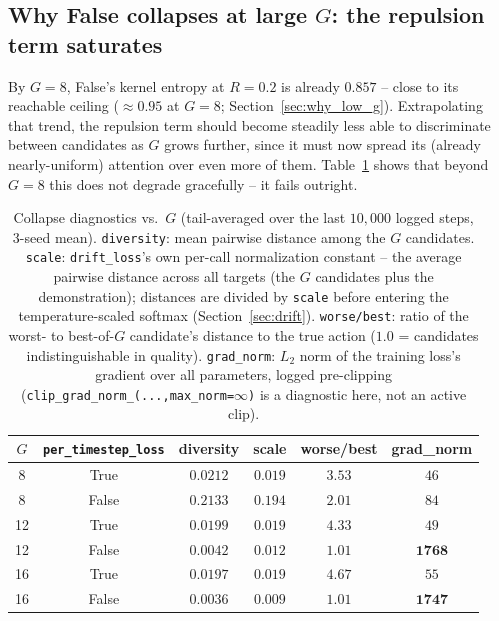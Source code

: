 \documentclass[11pt]{article}
\begin{document}
\subsection{Why False collapses at large $G$: the repulsion term saturates}
\label{sec:why_high_g}

By $G=8$, False's kernel entropy at $R=0.2$ is already $0.857$ -- close to
its reachable ceiling ($\approx0.95$ at $G=8$; Section~\ref{sec:why_low_g}).
Extrapolating that trend, the repulsion term should
become steadily less able to discriminate between candidates as $G$ grows
further, since it must now spread its (already nearly-uniform) attention
over even more of them. Table~\ref{tab:drift_collapse} shows that beyond
$G=8$ this does not degrade gracefully -- it fails outright.

\begin{table}[H]
\centering
\caption{Collapse diagnostics vs.\ $G$ (tail-averaged over the last $10{,}000$ logged steps, 3-seed mean). \texttt{diversity}: mean pairwise distance among the $G$ candidates. \texttt{scale}: \texttt{drift\_loss}'s own per-call normalization constant -- the average pairwise distance across all targets (the $G$ candidates plus the demonstration); distances are divided by \texttt{scale} before entering the temperature-scaled softmax (Section~\ref{sec:drift}). \texttt{worse/best}: ratio of the worst- to best-of-$G$ candidate's distance to the true action ($1.0$ = candidates indistinguishable in quality). \texttt{grad\_norm}: $L_2$ norm of the training loss's gradient over all parameters, logged pre-clipping (\texttt{clip\_grad\_norm\_(...,\allowbreak max\_norm=}$\infty$\texttt{)} is a diagnostic here, not an active clip).}
\label{tab:drift_collapse}
\begin{tabular}{cccccc}
\toprule
$G$ & \texttt{per\_timestep\_loss} & diversity & scale & worse/best & grad\_norm \\
\midrule
8  & True  & $0.0212$ & $0.019$  & $3.53$ & $46$ \\
8  & False & $0.2133$ & $0.194$  & $2.01$ & $84$ \\
12 & True  & $0.0199$ & $0.019$  & $\mathbf{4.33}$ & $49$ \\
12 & False & $\mathbf{0.0042}$ & $\mathbf{0.012}$  & $\mathbf{1.01}$ & $\mathbf{1768}$ \\
16 & True  & $0.0197$ & $0.019$  & $\mathbf{4.67}$ & $55$ \\
16 & False & $\mathbf{0.0036}$ & $\mathbf{0.009}$  & $\mathbf{1.01}$ & $\mathbf{1747}$ \\
\bottomrule
\end{tabular}
\end{table}
\end{document}
